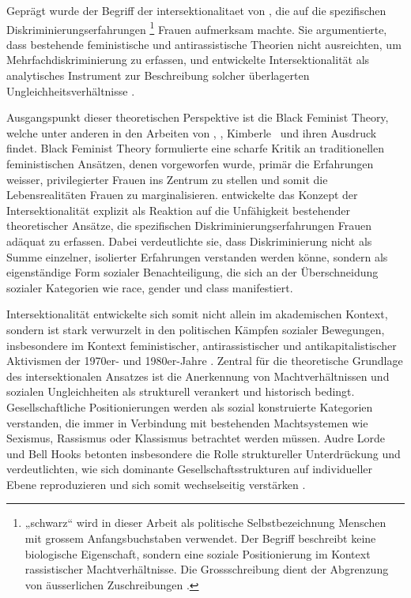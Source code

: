 Geprägt wurde der Begriff der \gls{intersektionalitaet} von \textcite{crenshawMappingMarginsIntersectionality1991}, die auf die spezifischen Diskriminierungserfahrungen \footnote{„\gls{schwarz}“ wird in dieser Arbeit als politische Selbstbezeichnung  Menschen mit grossem Anfangsbuchstaben verwendet. Der Begriff beschreibt keine biologische Eigenschaft, sondern eine soziale Positionierung im Kontext rassistischer Machtverhältnisse. Die Grossschreibung dient der Abgrenzung von äusserlichen Zuschreibungen \parencite{oguntoyeFarbeBekennenAfrodeutsche1986}.} Frauen aufmerksam machte. Sie argumentierte, dass bestehende feministische und antirassistische Theorien nicht ausreichten, um Mehrfachdiskriminierung zu erfassen, und entwickelte Intersektionalität als analytisches Instrument zur Beschreibung solcher überlagerten Ungleichheitsverhältnisse \parencite[\acrshort{vgl}][]{hancockWhenMultiplicationDoesnt2007}.

Ausgangspunkt dieser theoretischen Perspektive ist die Black Feminist Theory, welche unter anderen in den Arbeiten von \textcite{hooksAintWomanBlack1981}, \textcite{lordeSisterOutsiderEssays1984}, Kimberle~\textcite{crenshawMappingMarginsIntersectionality1991} und \textcite{collinsBlackFeministThought2002} ihren Ausdruck findet. Black Feminist Theory formulierte eine scharfe Kritik an traditionellen feministischen Ansätzen, denen vorgeworfen wurde, primär die Erfahrungen weisser, privilegierter Frauen ins Zentrum zu stellen und somit die Lebensrealitäten  Frauen zu marginalisieren. \textcite{crenshawMappingMarginsIntersectionality1991} entwickelte das Konzept der Intersektionalität explizit als Reaktion auf die Unfähigkeit bestehender theoretischer Ansätze, die spezifischen Diskriminierungserfahrungen  Frauen adäquat zu erfassen. Dabei verdeutlichte sie, dass Diskriminierung nicht als Summe einzelner, isolierter Erfahrungen verstanden werden könne, sondern als eigenständige Form sozialer Benachteiligung, die sich an der Überschneidung sozialer Kategorien wie \gls{race}, \gls{gender} und \gls{class} manifestiert.

Intersektionalität entwickelte sich somit nicht allein im akademischen Kontext, sondern ist stark verwurzelt in den politischen Kämpfen sozialer Bewegungen, insbesondere im Kontext feministischer, antirassistischer und antikapitalistischer Aktivismen der 1970er- und 1980er-Jahre \parencite{collinsBlackFeministThought2002}. Zentral für die theoretische Grundlage des intersektionalen Ansatzes ist die Anerkennung von Machtverhältnissen und sozialen Ungleichheiten als strukturell verankert und historisch bedingt. Gesellschaftliche Positionierungen werden als sozial konstruierte Kategorien verstanden, die immer in Verbindung mit bestehenden Machtsystemen wie Sexismus, Rassismus oder Klassismus betrachtet werden müssen. Audre Lorde und Bell Hooks betonten insbesondere die Rolle struktureller Unterdrückung und verdeutlichten, wie sich dominante Gesellschaftsstrukturen auf individueller Ebene reproduzieren und sich somit wechselseitig verstärken \parencite{collinsBlackFeministThought2002, hancockWhenMultiplicationDoesnt2007}.

